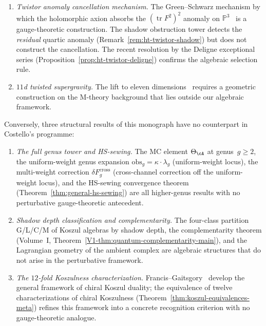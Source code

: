\begin{remark}
\begin{enumerate}[label=\textup{(\alph*)}]
\item
 \emph{Twistor anomaly cancellation mechanism.}
 The Green--Schwarz mechanism by which the holomorphic axion
 absorbs the $(\operatorname{tr} F^2)^2$ anomaly on
 $\mathbb{P}^3$~\cite{Costello2111} is a gauge-theoretic
 construction. The shadow obstruction tower detects the
 \emph{residual} quartic anomaly
 (Remark~\ref{rem:ht-twistor-shadow}) but does not
 construct the cancellation. The recent resolution by the
 Deligne exceptional series
 (Proposition~\ref{prop:ht-twistor-deligne}) confirms the
 algebraic selection rule.

\item
 \emph{$11$d twisted supergravity.}
 The lift to eleven dimensions~\cite{BittlestonCostello25}
 requires a geometric construction on the M-theory background
 that lies outside our algebraic framework.
\end{enumerate}
Conversely, three structural results of this monograph have
no counterpart in Costello's programme:
\begin{enumerate}[label=\textup{(\alph*)}]
\item
 \emph{The full genus tower and HS-sewing.}
 The MC element $\Theta_\cA$ at genus~$g \geq 2$, the
 uniform-weight genus expansion
 $\mathrm{obs}_g = \kappa \cdot \lambda_g$
 \textup{(uniform-weight locus)},
 the multi-weight correction
 $\delta F_g^{\mathrm{cross}}$
 \textup{(cross-channel correction off the uniform-weight locus)},
 and the HS-sewing convergence
 theorem (Theorem~\ref{thm:general-hs-sewing}) are all
 higher-genus results with no perturbative gauge-theoretic
 antecedent.

\item
 \emph{Shadow depth classification and complementarity.}
 The four-class partition G/L/C/M of Koszul algebras by shadow
 depth, the complementarity theorem
 (Volume~I, Theorem~\ref{V1-thm:quantum-complementarity-main}), and the
 Lagrangian geometry of the ambient complex are algebraic
 structures that do not arise in the perturbative framework.

\item
 \emph{The $12$-fold Koszulness characterization.}
 Francis--Gaitsgory~\cite{FG12} develop the general
 framework of chiral Koszul duality; the equivalence of twelve
 characterizations of chiral Koszulness
 (Theorem~\ref{thm:koszul-equivalences-meta})
 refines this framework into a concrete recognition criterion
 with no gauge-theoretic analogue.
\end{enumerate}
\end{remark}

